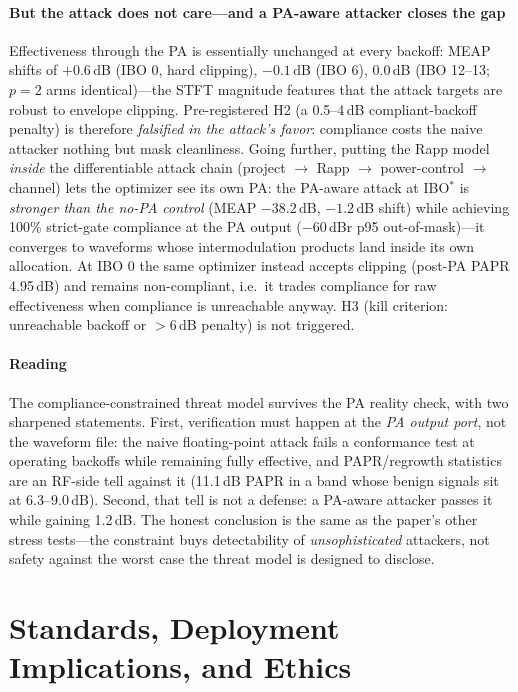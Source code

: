 \documentclass[review]{elsarticle}
\begin{document}
\paragraph{But the attack does not care---and a PA-aware attacker closes
the gap} Effectiveness through the PA is essentially unchanged at every
backoff: MEAP shifts of $+0.6$\,dB (IBO 0, hard clipping), $-0.1$\,dB
(IBO 6), $0.0$\,dB (IBO 12--13; $p{=}2$ arms identical)---the STFT
magnitude features that the attack targets are robust to envelope
clipping. Pre-registered H2 (a 0.5--4\,dB compliant-backoff penalty) is
therefore \emph{falsified in the attack's favor}: compliance costs the
naive attacker nothing but mask cleanliness. Going further, putting the
Rapp model \emph{inside} the differentiable attack chain
(project $\rightarrow$ Rapp $\rightarrow$ power-control $\rightarrow$
channel) lets the optimizer see its own PA: the PA-aware attack at
IBO$^{*}$ is \emph{stronger than the no-PA control} (MEAP $-38.2$\,dB,
$-1.2$\,dB shift) while achieving 100\% strict-gate compliance at the PA
output ($-60$\,dBr p95 out-of-mask)---it converges to waveforms whose
intermodulation products land inside its own allocation. At IBO 0 the
same optimizer instead accepts clipping (post-PA PAPR 4.95\,dB) and
remains non-compliant, i.e.\ it trades compliance for raw effectiveness
when compliance is unreachable anyway. H3 (kill criterion: unreachable
backoff or $>$6\,dB penalty) is not triggered.

\paragraph{Reading} The compliance-constrained threat model survives the
PA reality check, with two sharpened statements. First, verification
must happen at the \emph{PA output port}, not the waveform file: the
naive floating-point attack fails a conformance test at operating
backoffs while remaining fully effective, and PAPR/regrowth statistics
are an RF-side tell against it (11.1\,dB PAPR in a band whose benign
signals sit at 6.3--9.0\,dB). Second, that tell is not a defense: a
PA-aware attacker passes it while gaining 1.2\,dB. The honest conclusion
is the same as the paper's other stress tests---the constraint buys
detectability of \emph{unsophisticated} attackers, not safety against
the worst case the threat model is designed to disclose.


\section{Standards, Deployment Implications, and Ethics}
\label{sec:standards}
\end{document}
